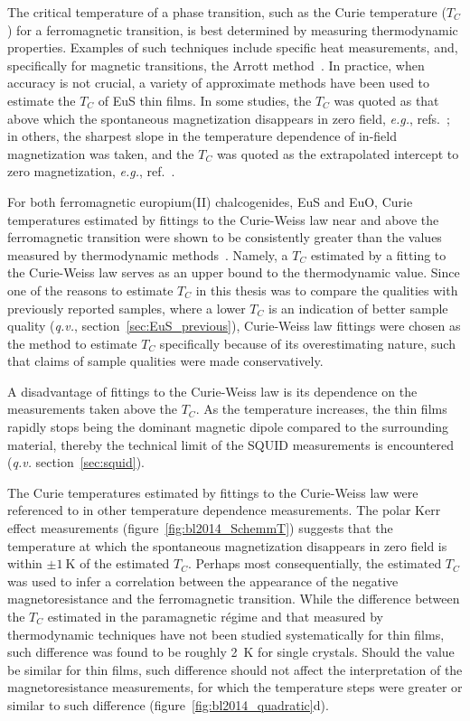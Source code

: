The critical temperature of a phase transition, such as the Curie temperature ($T_C$) for a ferromagnetic transition, is best determined by measuring thermodynamic properties. Examples of such techniques include specific heat measurements, and, specifically for magnetic transitions, the Arrott method~\cite{Arrott1957}. In practice, when accuracy is not crucial, a variety of approximate methods have been used to estimate the $T_C$ of EuS thin films. In some studies, the $T_C$ was quoted as that above which the spontaneous magnetization disappears in zero field, \textit{e.g.}, refs.~\cite{EuS_MBE_Dauth, Moodera2013}; in others, the sharpest slope in the temperature dependence of in-field magnetization was taken, and the $T_C$ was quoted as the extrapolated intercept to zero magnetization, \textit{e.g.}, ref.~\cite{EuS_PLD1}.

For both ferromagnetic europium(II) chalcogenides, EuS and EuO, Curie temperatures estimated by fittings to the Curie-Weiss law near and above the ferromagnetic transition were shown to be consistently greater than the values measured by thermodynamic methods~\cite{Eu_mag_compounds}. Namely, a $T_C$ estimated by a fitting to the Curie-Weiss law serves as an upper bound to the thermodynamic value. Since one of the reasons to estimate $T_C$ in this thesis was to compare the qualities with previously reported samples, where a lower $T_C$ is an indication of better sample quality (\textit{q.v.}, section~\ref{sec:EuS_previous}), Curie-Weiss law fittings were chosen as the method to estimate $T_C$ specifically because of its overestimating nature, such that claims of sample qualities were made conservatively.

A disadvantage of fittings to the Curie-Weiss law is its dependence on the measurements taken above the $T_C$. As the temperature increases, the thin films rapidly stops being the dominant magnetic dipole compared to the surrounding material, thereby the technical limit of the SQUID measurements is encountered (\textit{q.v.} section~\ref{sec:squid}). 

The Curie temperatures estimated by fittings to the Curie-Weiss law were referenced to in other temperature dependence measurements. The polar Kerr effect measurements (figure~\ref{fig:bl2014_SchemmT}) suggests that the temperature at which the spontaneous magnetization disappears in zero field is within $\pm1~\mathrm{K}$ of the estimated $T_C$. Perhaps most consequentially, the estimated $T_C$ was used to infer a correlation between the appearance of the negative magnetoresistance and the ferromagnetic transition. While the difference between the $T_C$ estimated in the paramagnetic r\'egime and that measured by thermodynamic techniques have not been studied systematically for thin films, such difference was found to be roughly \SI{2}{K} for single crystals. Should the value be similar for thin films, such difference should not affect the interpretation of the magnetoresistance measurements, for which the temperature steps were greater or similar to such difference (figure~\ref{fig:bl2014_quadratic}d).